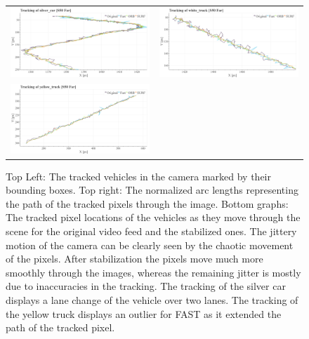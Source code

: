 \begin{figure}[!ht]
\begin{tabular}{cc}
    \includegraphics[width=0.475\linewidth]{diagrams/object_tracking/s50_s_far/silver_car.png}    &  
    \includegraphics[width=0.475\linewidth]{diagrams/object_tracking/s50_s_far/white_truck.png}    \\  
    \includegraphics[width=0.475\linewidth]{diagrams/object_tracking/s50_s_far/yellow_truck.png}   
  \end{tabular}
  \caption{Top Left:
  The tracked vehicles in the camera  marked by their bounding boxes. 
  Top right: 
  The normalized arc lengths representing the path of the tracked pixels through the image.
  Bottom graphs:
  The tracked pixel locations of the vehicles as they move through the scene for the original video feed and the stabilized ones.
  The jittery motion of the camera can be clearly seen by the chaotic movement of the pixels.
  After stabilization the pixels move much more smoothly through the images, whereas the remaining jitter is mostly due to inaccuracies in the tracking. 
  The tracking of the silver car displays a lane change of the vehicle over two lanes.
  The tracking of the yellow truck displays an outlier for FAST as it extended the path of the tracked pixel.
  }
  \label{fig:object_tracking_appendix_s50_s_far}
\end{figure}

